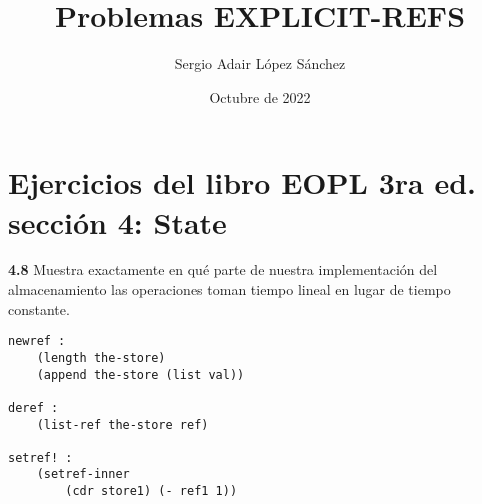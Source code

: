 \documentclass{article}
\title{Problemas EXPLICIT-REFS}
\author{Sergio Adair López Sánchez}
\date{Octubre de 2022}
\begin{document}
\maketitle

\section{Ejercicios del libro EOPL 3ra ed. sección 4: State}

\textbf{4.8}  Muestra exactamente en qué parte de nuestra implementación del almacenamiento las operaciones toman tiempo lineal en lugar de tiempo constante.

\begin{verbatim}
newref :
    (length the-store)
    (append the-store (list val))

deref :
    (list-ref the-store ref)

setref! :
    (setref-inner
        (cdr store1) (- ref1 1))
        
\end{verbatim}
\end{document}

